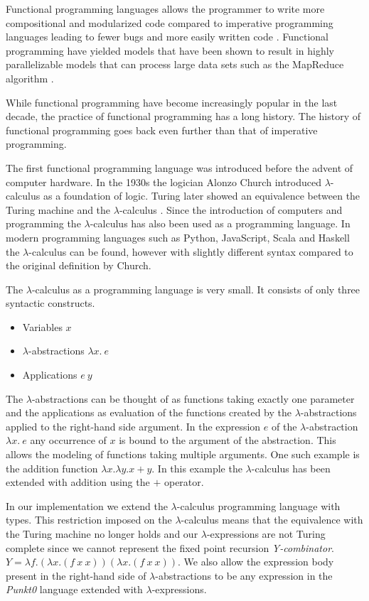 Functional programming languages allows the programmer to write more compositional and modularized code compared to imperative programming languages leading to fewer bugs and more easily written code \cite{hughes1989functional}. Functional programming have yielded models that have been shown to result in highly parallelizable models that can process large data sets such as the MapReduce algorithm \cite{guo2004mapreduce}.

While functional programming have become increasingly popular in the last decade, the practice of functional programming has a long history. The history of functional programming goes back even further than that of imperative programming.

The first functional programming language was introduced before the advent of computer hardware. In the 1930s the logician Alonzo Church \cite{church1932set} introduced $\lambda$-calculus as a foundation of logic. Turing later showed an equivalence between the Turing machine and the $\lambda$-calculus
\cite{turing1937computability}. Since the introduction of computers and programming the $\lambda$-calculus has also been used as a programming language. In modern programming languages such as Python, JavaScript, Scala and Haskell the $\lambda$-calculus can be found, however with slightly different syntax compared to the original definition by Church.

The $\lambda$-calculus as a programming language is very small. It consists of only three syntactic constructs.

\begin{itemize}
\item Variables $x$
\item $\lambda$-abstractions $\lambda x.\ e$
\item Applications $e\ y$
\end{itemize}

The $\lambda$-abstractions can be thought of as functions taking exactly one parameter and the applications as evaluation of the functions created by the $\lambda$-abstractions applied to the right-hand side argument. In the expression $e$ of the $\lambda$-abstraction $\lambda x.\ e$ any occurrence of $x$ is bound to the argument of the abstraction. This allows the modeling of functions taking multiple arguments. One such example is the addition function $\lambda x. \lambda y. x + y$. In this example the $\lambda$-calculus has been extended with addition using the $+$ operator.

In our implementation we extend the $\lambda$-calculus programming language with types. This restriction imposed on the $\lambda$-calculus means that the equivalence with the Turing machine no longer holds and our $\lambda$-expressions are not Turing complete since we cannot represent the fixed point recursion \textit{Y-combinator}.
$Y = \lambda f. (\lambda x. (f\ x\ x)) (\lambda x. (f\ x\ x))$. We also allow the expression body present in the right-hand side of $\lambda$-abstractions to be any expression in the \textit{Punkt0} language extended with $\lambda$-expressions.

